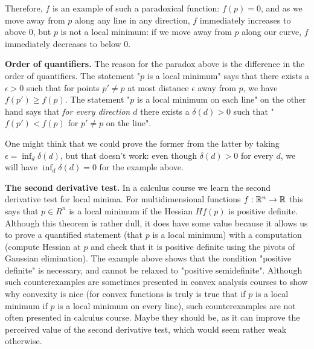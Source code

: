 Therefore, $f$ is an example of such a paradoxical function: $f(p) = 0$, and as we move away from $p$ along any line in any direction, $f$ immediately increases to above $0$, but $p$ is not a local minimum: if we move away from $p$ along our curve, $f$ immediately decreases to below $0$.

\textbf{Order of quantifiers.}
The reason for the paradox above is the difference in the order of quantifiers. The statement "$p$ is a local minimum" says that there exists a $\epsilon>0$ such that for points $p' \neq p$ at most distance $\epsilon$ away from $p$, we have $f(p') \geq f(p)$.
The statement "$p$ is a local minimum on each line" on the other hand says that \emph{for every direction $d$} there exists a $\delta(d)>0$ such that "$f(p') < f(p)$ for $p' \neq p$ on the line".

One might think that we could prove the former from the latter by taking $\epsilon = \inf_d \delta(d)$, but that doesn't work: even though $\delta(d) > 0$ for every $d$, we will have $\inf_d \delta(d) = 0$ for the example above.

\textbf{The second derivative test.}
In a calculus course we learn the second derivative test for local minima.
For multidimensional functions $f : \mathbb{R}^n \to \mathbb{R}$ this says that $p \in R^n$ is a local minimum if the Hessian $Hf(p)$ is positive definite.
Although this theorem is rather dull, it does have some value because it allows us to prove a quantified statement (that $p$ is a local minimum) with a computation (compute Hessian at $p$ and check that it is positive definite using the pivots of Gaussian elimination).
The example above shows that the condition "positive definite" is necessary, and cannot be relaxed to "positive semidefinite".
Although such counterexamples are sometimes presented in convex analysis courses to show why convexity is nice (for convex functions is truly is true that if $p$ is a local minimum if $p$ is a local minimum on every line), such counterexamples are not often presented in calculus course. Maybe they should be, as it can improve the perceived value of the second derivative test, which would seem rather weak otherwise.


